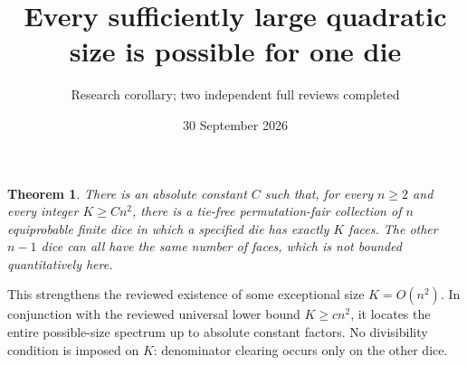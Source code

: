 \documentclass[11pt]{article}
\title{Every sufficiently large quadratic size is possible for one die}
\author{Research corollary; two independent full reviews completed}
\date{30 September 2026}
\newtheorem{theorem}{Theorem}
\begin{document}
\maketitle

\begin{theorem}
There is an absolute constant $C$ such that, for every $n\ge2$ and
\emph{every integer} $K\ge Cn^2$, there is a tie-free permutation-fair
collection of $n$ equiprobable finite dice in which a specified die has
exactly $K$ faces. The other $n-1$ dice can all have the same number
of faces, which is not bounded quantitatively here.
\end{theorem}

This strengthens the reviewed existence of some exceptional size
$K=O(n^2)$. In conjunction with the reviewed universal lower bound
$K\ge cn^2$, it locates the entire possible-size spectrum up to
absolute constant factors. No divisibility condition is imposed on
$K$: denominator clearing occurs only on the other dice.
\end{document}
